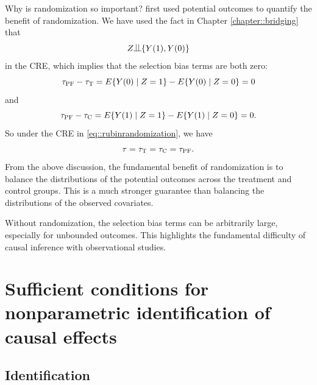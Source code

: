  
 Why is randomization so important? \citet{rubin1978bayesian} first used potential outcomes to quantify the benefit of randomization. We have used the fact in Chapter \ref{chapter::bridging} that 
\begin{equation}\label{eq::rubinrandomization}
 Z  \ind \{ Y (1) , Y (0) \}
\end{equation}
in the CRE,  which implies that the selection bias terms are both zero:
 $$
  \tau_\textsc{PF} - \tau_\textsc{T}  = 
 E\{   Y(0)  \mid Z = 1 \} - E\{   Y(0)  \mid Z = 0 \}  = 0
 $$
 and
 $$
   \tau_\textsc{PF} - \tau_\textsc{C} =
 E\{   Y(1)  \mid Z = 1 \} - E\{   Y(1)  \mid Z = 0 \}  = 0. 
 $$
 So under the CRE in \eqref{eq::rubinrandomization},  we have 
\begin{equation}
\label{eq::no-selection-bias-all-equal}
 \tau = \tau_\textsc{T} = \tau_\textsc{C} = \tau_\textsc{PF}.
\end{equation}
From the above discussion, the fundamental benefit of randomization is to balance the distributions of the potential outcomes across the treatment and control groups. This is a much stronger guarantee than balancing the distributions of the observed covariates. 
 

Without randomization, the selection bias terms can be arbitrarily large, especially for unbounded outcomes. This highlights the fundamental difficulty of causal inference with observational studies. 


\section{Sufficient conditions for nonparametric identification of causal effects} 
 
 
 
\subsection{Identification}\label{sec::identification-ignorability}
 
